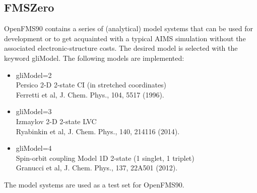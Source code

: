 \documentclass[11pt]{article}
\begin{document}
\subsection{FMSZero}
\label{zero} 

OpenFMS90 contains a series of (analytical) model systems that can be used for development or to get acquainted with a typical AIMS simulation without the associated electronic-structure costs. The desired model is selected with the keyword gliModel. The following models are implemented:

\begin{itemize}
\item gliModel=2 \\ Persico 2-D 2-state CI (in stretched coordinates) \\ Ferretti et al, J. Chem. Phys., 104, 5517 (1996).

\item gliModel=3 \\ Izmaylov 2-D 2-state LVC \\
   Ryabinkin et al, J. Chem. Phys., 140, 214116 (2014). 
\item gliModel=4 \\ 
Spin-orbit coupling Model 1D 2-state (1 singlet, 1 triplet)  \\
   Granucci et al, J. Chem. Phys., 137, 22A501 (2012). 
\end{itemize}

The model systems are used as a test set for OpenFMS90.
\end{document}
